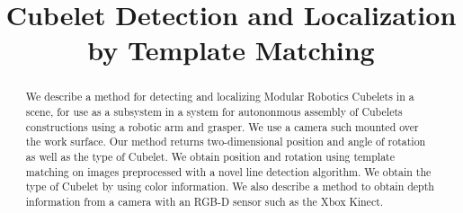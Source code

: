\documentclass[conference]{IEEEtran}
\begin{document}
%
\title{Cubelet Detection and Localization by Template Matching}


\author{
\and
{}
\and
{}
}









\maketitle


\begin{abstract}
We describe a method for detecting and localizing Modular Robotics Cubelets in a scene, for use as a subsystem in a system for autononmous assembly of Cubelets constructions using a robotic arm and grasper. We use a camera such mounted over the work surface. Our method returns two-dimensional position and angle of rotation as well as the type of Cubelet. We obtain position and rotation using template matching on images preprocessed with a novel line detection algorithm. We obtain the type of Cubelet by using color information. We also describe a method to obtain depth information from a camera with an RGB-D sensor such as the Xbox Kinect.
\end{abstract}
\end{document}
